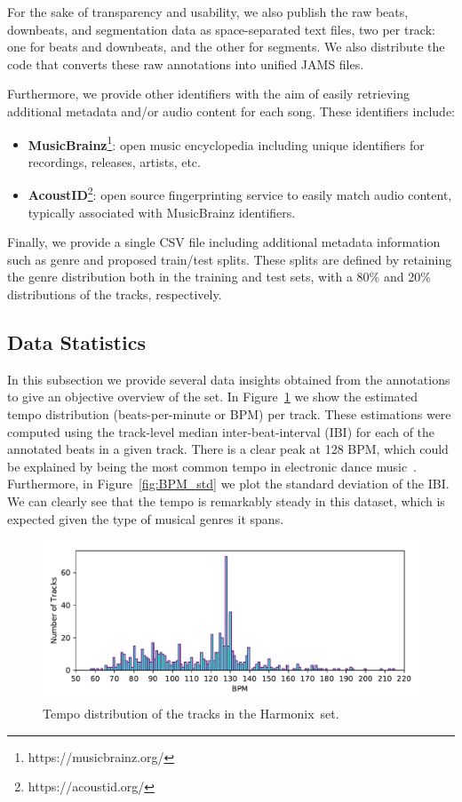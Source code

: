 \documentclass{article}
\newcommand{\setName}{Harmonix}
\begin{document}
For the sake of transparency and usability, we also publish the raw beats, downbeats, and segmentation data as space-separated text files, two per track: one for beats and downbeats, and the other for segments.
We also distribute the code that converts these raw annotations into unified JAMS files.

Furthermore, we provide other identifiers with the aim of easily retrieving additional metadata and/or audio content for each song.
These identifiers include:

\begin{itemize}
    \item \textbf{MusicBrainz}\footnote{https://musicbrainz.org/}: open music encyclopedia including unique identifiers for recordings, releases, artists, etc. 
    \item \textbf{AcoustID}\footnote{https://acoustid.org/}: open source fingerprinting service to easily match audio content, typically associated with MusicBrainz identifiers.
\end{itemize}

Finally, we provide a single CSV file including additional metadata information such as genre and proposed train/test splits.
These splits are defined by retaining the genre distribution both in the training and test sets, with a 80\% and 20\% distributions of the tracks, respectively.

\subsection{Data Statistics}

In this subsection we provide several data insights obtained from the annotations to give an objective overview of the set.
In Figure~\ref{fig:BPM_dist} we show the estimated tempo distribution (beats-per-minute or BPM) per track.
These estimations were computed using the track-level median inter-beat-interval (IBI) for each of the annotated beats in a given track.
There is a clear peak at 128 BPM, which could be explained by being the most common tempo in electronic dance music~\cite{Moelants2008}.
Furthermore, in Figure~\ref{fig:BPM_std} we plot the standard deviation of the IBI.
We can clearly see that the tempo is remarkably steady in this dataset, which is expected given the type of musical genres it spans.

\begin{figure}
    \centerline{\includegraphics[width=1.05\columnwidth]{figs/BPM_distribution.pdf}}
    \caption{Tempo distribution of the tracks in the \setName~set.}
    \label{fig:BPM_dist}
\end{figure}
\end{document}
